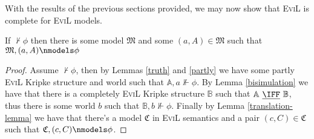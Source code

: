With the results of the previous sections provided, we may now show
that \textsc{EviL} is complete for \textsc{EviL} models.

\begin{theorem}
If $\nvdash \phi$ then there is some model $\mathfrak{M}$ and some $(a,A) \in \mathfrak{M}$ such that $\mathfrak{M},(a,A) \nmodels \phi$ 
\end{theorem}
\begin{proof}
	Assume $\nvdash \phi$, then by Lemmas \ref{truth} and \ref{partly} we have some partly \textsc{EviL} Kripke 
	structure and world such that $\mathbb{A},a \nVdash \phi$.  By Lemma \ref{bisimulation} we have that there is a 
	completely \textsc{EviL} Kripke structure $\mathbb{B}$ such that $\mathbb{A}\ \underline{\IFF}{}\ \mathbb{B}$, thus there is some world $b$ such that $\mathbb{B},b \nVdash \phi$.  
	Finally by Lemma \ref{translation-lemma} we have that there's a model $\mathfrak{C}$ in \textsc{EviL} semantics and a pair $(c,C) \in \mathfrak{C}$ such that $\mathfrak{C},(c,C) \nmodels \phi$.
\end{proof}

